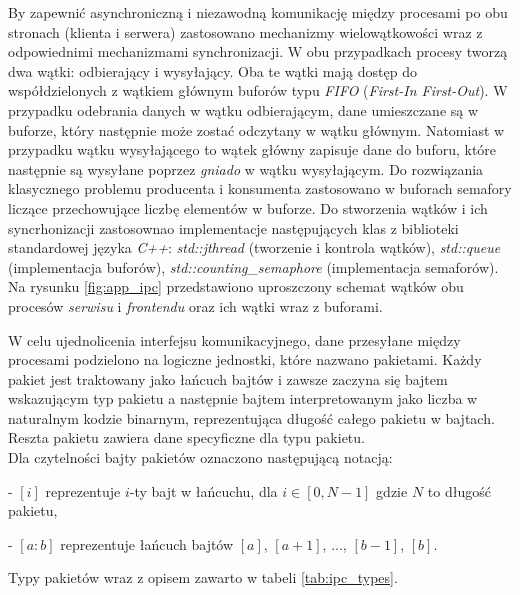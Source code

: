 By zapewnić asynchroniczną i niezawodną komunikację między procesami po obu stronach (klienta i serwera) zastosowano mechanizmy wielowątkowości wraz z odpowiednimi mechanizmami synchronizacji.
W obu przypadkach procesy tworzą dwa wątki: odbierający i wysyłający. Oba te wątki mają dostęp
do współdzielonych z wątkiem głównym buforów typu \textit{FIFO} (\textit{First-In First-Out}).
W przypadku odebrania danych w wątku odbierającym, dane umieszczane są w buforze, 
który następnie może zostać odczytany w wątku głównym. Natomiast w przypadku wątku wysyłającego
to wątek główny zapisuje dane do buforu, które następnie są wysyłane poprzez \textit{gniado} w 
wątku wysyłającym. Do rozwiązania klasycznego problemu producenta i konsumenta 
zastosowano w buforach semafory liczące przechowujące liczbę elementów w buforze.
Do stworzenia wątków i ich syncrhonizacji zastosownao implementacje następujących klas
z biblioteki standardowej języka \textit{C++}: \textit{std::jthread} (tworzenie i kontrola wątków), 
\textit{std::queue} (implementacja buforów), \textit{std::counting\_semaphore} 
(implementacja semaforów). Na rysunku \ref{fig:app_ipc} przedstawiono uproszczony schemat wątków
obu procesów \textit{serwisu} i \textit{frontendu} oraz ich wątki wraz z buforami.


W celu ujednolicenia interfejsu komunikacyjnego, dane przesyłane między procesami podzielono
na logiczne jednostki, które nazwano pakietami. Każdy pakiet jest traktowany jako łańcuch bajtów
i zawsze zaczyna się bajtem wskazującym typ pakietu a następnie bajtem interpretowanym jako liczba
w naturalnym kodzie binarnym, reprezentująca długość całego pakietu w bajtach. Reszta pakietu
zawiera dane specyficzne dla typu pakietu.\\ 
Dla czytelności bajty pakietów oznaczono następującą notacją: 

- $[i]$ reprezentuje $i$-ty bajt w łańcuchu, dla $i \in [0, N-1]$ gdzie $N$ to długość pakietu,

- $[a:b]$ reprezentuje łańcuch bajtów $[a]$, $[a+1]$, $...$, $[b-1]$, $[b]$. 

Typy pakietów wraz z opisem zawarto w tabeli \ref{tab:ipc_types}.

